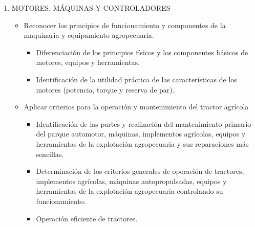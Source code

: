 \documentclass[../main]{subfiles}
\begin{document}
\begin{enumerate}
    \item MOTORES, MÁQUINAS Y CONTROLADORES
    
    \begin{itemize}
        \item Reconocer los principios
de funcionamiento y componentes de la maquinaria y equipamiento agropecuaria. 
    \begin{itemize}
        \item Diferenciación de los principios físicos y los componentes
básicos de motores, equipos y herramientas.
\item Identificación de la utilidad práctica de las características
de los motores (potencia, torque y reserva de par).
    \end{itemize}
    \item Aplicar criterios para la operación y mantenimiento del tractor agrícola 
    \begin{itemize}
        \item Identificación de las partes y realización del
mantenimiento primario del parque automotor, máquinas,
implementos agrícolas, equipos y herramientas de la
explotación agropecuaria y sus reparaciones más
sencillas.
\item Determinación de los criterios generales de operación de
tractores, implementos agrícolas, máquinas
autopropulsadas, equipos y herramientas de la
explotación agropecuaria controlando su funcionamiento.
\item Operación eficiente de tractores. 


\end{itemize}
\end{itemize}
\end{enumerate}
\end{document}
